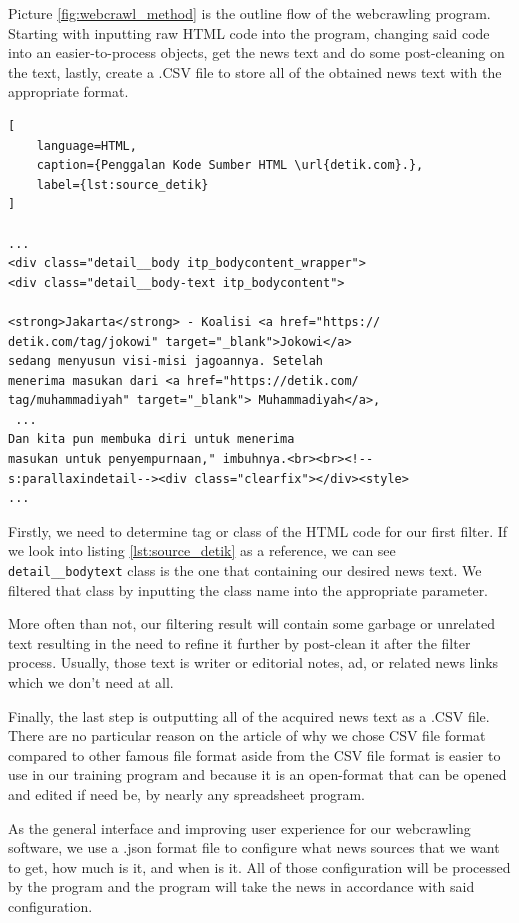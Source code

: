 Picture \ref{fig:webcrawl_method} is the outline flow of the webcrawling program. Starting with inputting raw HTML code into the program, changing said code into an easier-to-process objects, get the news text and do some post-cleaning on the text, lastly, create a .CSV file to store all of the obtained news text with the appropriate format.

\begin{lstlisting}[
    language=HTML, 
    caption={Penggalan Kode Sumber HTML \url{detik.com}.},
    label={lst:source_detik}
]

...
<div class="detail__body itp_bodycontent_wrapper">
<div class="detail__body-text itp_bodycontent">

<strong>Jakarta</strong> - Koalisi <a href="https://
detik.com/tag/jokowi" target="_blank">Jokowi</a> 
sedang menyusun visi-misi jagoannya. Setelah 
menerima masukan dari <a href="https://detik.com/
tag/muhammadiyah" target="_blank"> Muhammadiyah</a>,
 ... 
Dan kita pun membuka diri untuk menerima 
masukan untuk penyempurnaan," imbuhnya.<br><br><!--
s:parallaxindetail--><div class="clearfix"></div><style>
...

\end{lstlisting}

Firstly, we need to determine tag or class of the HTML code for our first filter. If we look into listing \ref{lst:source_detik} as a reference, we can see \texttt{detail\_\_body\-text} class is the one that containing our desired news text. We filtered that class by inputting the class name into the appropriate parameter.

More often than not, our filtering result will contain some garbage or unrelated text resulting in the need to refine it further by post-clean it after the filter process. Usually, those text is writer or editorial notes, ad, or related news links which we don't need at all.

Finally, the last step is outputting all of the acquired news text as a .CSV file. There are no particular reason on the article of why we chose CSV file format compared to other famous file format aside from the CSV file format is easier to use in our training program and because it is an open-format that can be opened and edited if need be, by nearly any spreadsheet program.

As the general interface and improving user experience for our webcrawling software, we use a .json format file to configure what news sources that we want to get, how much is it, and when is it. All of those configuration will be processed by the program and the program will take the news in accordance with said configuration.


